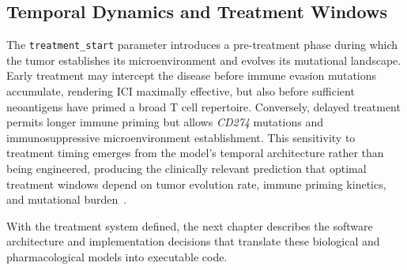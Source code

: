 \subsection{Temporal Dynamics and Treatment Windows}

The \texttt{treatment\_start} parameter introduces a pre-treatment phase during which the tumor establishes its microenvironment and evolves its mutational landscape. Early treatment may intercept the disease before immune evasion mutations accumulate, rendering ICI maximally effective, but also before sufficient neoantigens have primed a broad T cell repertoire. Conversely, delayed treatment permits longer immune priming but allows \textit{CD274} mutations and immunosuppressive microenvironment establishment. This sensitivity to treatment timing emerges from the model's temporal architecture rather than being engineered, producing the clinically relevant prediction that optimal treatment windows depend on tumor evolution rate, immune priming kinetics, and mutational burden~\cite{Motzer2018}.

With the treatment system defined, the next chapter describes the software architecture and implementation decisions that translate these biological and pharmacological models into executable code.